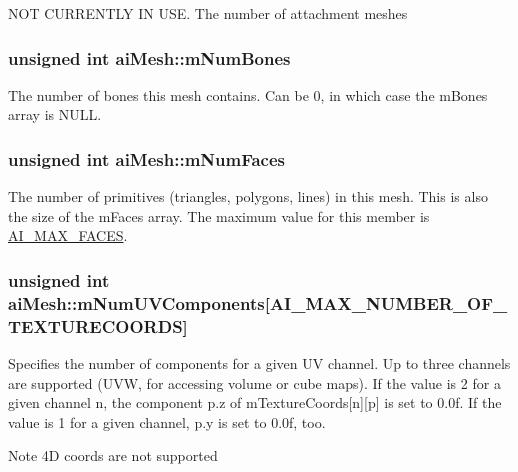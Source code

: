 N\-O\-T C\-U\-R\-R\-E\-N\-T\-L\-Y I\-N U\-S\-E. The number of attachment meshes \hypertarget{structai_mesh_a0f9d5425b6300e32a842a94f943fd79e}{
\subsubsection[{m\-Num\-Bones}]{\setlength{\rightskip}{0pt plus 5cm}unsigned int ai\-Mesh\-::m\-Num\-Bones}}\label{structai_mesh_a0f9d5425b6300e32a842a94f943fd79e}
The number of bones this mesh contains. Can be 0, in which case the m\-Bones array is N\-U\-L\-L. \hypertarget{structai_mesh_aeed22ee6963b79548f3877b3c905518e}{
\subsubsection[{m\-Num\-Faces}]{\setlength{\rightskip}{0pt plus 5cm}unsigned int ai\-Mesh\-::m\-Num\-Faces}}\label{structai_mesh_aeed22ee6963b79548f3877b3c905518e}
The number of primitives (triangles, polygons, lines) in this mesh. This is also the size of the m\-Faces array. The maximum value for this member is \hyperlink{ai_mesh_8h_aef69217e80411f3fee5aae3dc06b68ba}{A\-I\-\_\-\-M\-A\-X\-\_\-\-F\-A\-C\-E\-S}. \hypertarget{structai_mesh_a635c631a6e66d32989d6b25b2a892d86}{
\subsubsection[{m\-Num\-U\-V\-Components}]{\setlength{\rightskip}{0pt plus 5cm}unsigned int ai\-Mesh\-::m\-Num\-U\-V\-Components\mbox{[}{\bf A\-I\-\_\-\-M\-A\-X\-\_\-\-N\-U\-M\-B\-E\-R\-\_\-\-O\-F\-\_\-\-T\-E\-X\-T\-U\-R\-E\-C\-O\-O\-R\-D\-S}\mbox{]}}}\label{structai_mesh_a635c631a6e66d32989d6b25b2a892d86}
Specifies the number of components for a given U\-V channel. Up to three channels are supported (U\-V\-W, for accessing volume or cube maps). If the value is 2 for a given channel n, the component p.\-z of m\-Texture\-Coords\mbox{[}n\mbox{]}\mbox{[}p\mbox{]} is set to 0.\-0f. If the value is 1 for a given channel, p.\-y is set to 0.\-0f, too. \begin{DoxyNote}{Note}
4\-D coords are not supported 
\end{DoxyNote}
